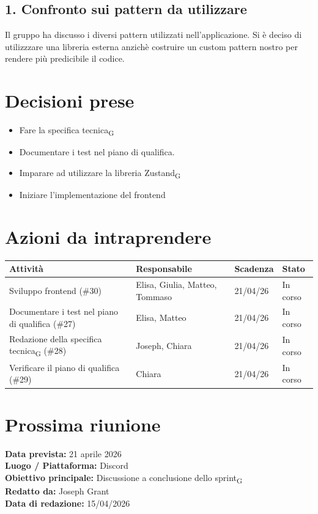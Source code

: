 \documentclass[a4paper,12pt]{article}
\newcommand{\gls}[1]{#1\textsubscript{G}}
\begin{document}
\subsection*{1. Confronto sui pattern da utilizzare}
Il gruppo ha discusso i diversi pattern utilizzati nell’applicazione. Si è deciso di utilizzzare una libreria esterna anzichè costruire un custom pattern nostro per rendere più predicibile il codice.


\section*{Decisioni prese}
\begin{itemize}
    \item Fare la \gls{specifica tecnica}
    \item Documentare i test nel piano di qualifica.
    \item Imparare ad utilizzare la libreria \gls{Zustand}
    \item Iniziare l'implementazione del frontend
\end{itemize}

\section*{Azioni da intraprendere}
\begin{longtable}{|p{}|p{}|p{}|p{}|}
\hline
\textbf{Attività} & \textbf{Responsabile} & \textbf{Scadenza} & \textbf{Stato} \\ \hline
Sviluppo frontend (\#30) & Elisa, Giulia, Matteo, Tommaso & 21/04/26 & In corso \\ \hline
Documentare i test nel piano di qualifica (\#27) & Elisa, Matteo & 21/04/26 & In corso \\ \hline
Redazione della \gls{specifica tecnica} (\#28) & Joseph, Chiara & 21/04/26 & In corso \\ \hline
Verificare il piano di qualifica (\#29) & Chiara & 21/04/26 & In corso \\ \hline
\end{longtable}


\section*{Prossima riunione}
\textbf{Data prevista:} 21 aprile 2026\\
\textbf{Luogo / Piattaforma:} Discord \\
\textbf{Obiettivo principale:} Discussione a conclusione dello \gls{sprint}\\



\textbf{Redatto da:} Joseph Grant \\
\textbf{Data di redazione:} 15/04/2026
\end{document}
